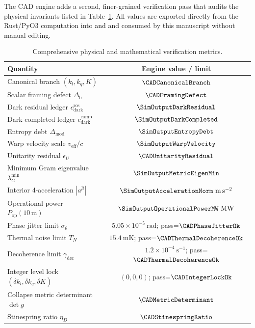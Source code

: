 The CAD engine adds a second, finer-grained verification pass that audits the
physical invariants listed in Table~\ref{tab:cad-verification}.  All values are
exported directly from the Rust/PyO3 computation into  and
 and consumed by this manuscript without manual
editing.

\begin{table}[htbp]
  \centering
  \caption{Comprehensive physical and mathematical verification metrics.}
  \label{tab:cad-verification}
  \begin{tabular}{lc}
    \toprule
    \textbf{Quantity} & \textbf{Engine value / limit} \\
    \midrule
    Canonical branch $(k_l,k_q,K)$ & $\CADCanonicalBranch$ \\
    Scalar framing defect $\Delta_{\mathrm{fr}}$ & $\CADFramingDefect$ \\
    Dark residual ledger $c_{\mathrm{dark}}^{\mathrm{res}}$ & $\SimOutputDarkResidual$ \\
    Dark completed ledger $c_{\mathrm{dark}}^{\mathrm{comp}}$ & $\SimOutputDarkCompleted$ \\
    Entropy debt $\Delta_{\mathrm{mod}}$ & $\SimOutputEntropyDebt$ \\
    Warp velocity scale $v_{\mathrm{eff}}/c$ & $\SimOutputWarpVelocity$ \\
    Unitarity residual $\epsilon_U$ & $\CADUnitarityResidual$ \\
    Minimum Gram eigenvalue $\lambda_G^{\min}$ & $\SimOutputMetricEigenMin$ \\
    Interior 4-acceleration $|a^{\hat\mu}|$ & $\SimOutputAccelerationNorm\ \mathrm{m\,s^{-2}}$ \\
    Operational power $P_{\mathrm{op}}(10\,\mathrm{m})$ & $\SimOutputOperationalPowerMW\ \mathrm{MW}$ \\
    Phase jitter limit $\sigma_\theta$ & $5.05\times10^{-5}\ \mathrm{rad}$; pass=$\CADPhaseJitterOk$ \\
    Thermal noise limit $T_N$ & $15.4\ \mathrm{mK}$; pass=$\CADThermalDecoherenceOk$ \\
    Decoherence limit $\gamma_{\mathrm{dec}}$ & $1.2\times10^{-4}\ \mathrm{s^{-1}}$; pass=$\CADThermalDecoherenceOk$ \\
    Integer level lock $(\delta k_l,\delta k_q,\delta K)$ & $(0,0,0)$; pass=$\CADIntegerLockOk$ \\
    Collapse metric determinant $\det g$ & $\CADMetricDeterminant$ \\
    Stinespring ratio $\eta_D$ & $\CADStinespringRatio$ \\
    \bottomrule
  \end{tabular}
\end{table}